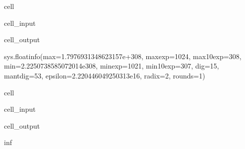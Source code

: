 \documentclass[letterpaper,10pt,english]{jupyterBook}
\begin{document}
\begin{sphinxuseclass}{cell}\begin{sphinxVerbatimInput}

\begin{sphinxuseclass}{cell_input}
\begin{sphinxVerbatim}[commandchars=\\\{\}]
 
\end{sphinxVerbatim}

\end{sphinxuseclass}\end{sphinxVerbatimInput}
\begin{sphinxVerbatimOutput}

\begin{sphinxuseclass}{cell_output}
\begin{sphinxVerbatim}[commandchars=\\\{\}]
sys.float\PYGZus{}info(max=1.7976931348623157e+308, max\PYGZus{}exp=1024, max\PYGZus{}10\PYGZus{}exp=308, min=2.2250738585072014e\PYGZhy{}308, min\PYGZus{}exp=\PYGZhy{}1021, min\PYGZus{}10\PYGZus{}exp=\PYGZhy{}307, dig=15, mant\PYGZus{}dig=53, epsilon=2.220446049250313e\PYGZhy{}16, radix=2, rounds=1)
\end{sphinxVerbatim}

\end{sphinxuseclass}\end{sphinxVerbatimOutput}

\end{sphinxuseclass}
\begin{sphinxuseclass}{cell}\begin{sphinxVerbatimInput}

\begin{sphinxuseclass}{cell_input}
\begin{sphinxVerbatim}[commandchars=\\\{\}]
 
\end{sphinxVerbatim}

\end{sphinxuseclass}\end{sphinxVerbatimInput}
\begin{sphinxVerbatimOutput}

\begin{sphinxuseclass}{cell_output}
\begin{sphinxVerbatim}[commandchars=\\\{\}]
inf
\end{sphinxVerbatim}

\end{sphinxuseclass}\end{sphinxVerbatimOutput}

\end{sphinxuseclass}
\end{document}
